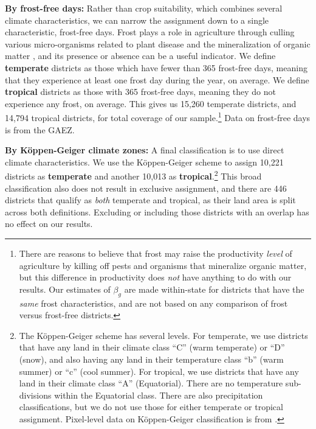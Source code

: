 \documentclass[11pt]{article}
\begin{document}
\vspace{.5cm}\noindent\textbf{By frost-free days:} Rather than crop suitability, which combines several climate characteristics, we can narrow the assignment down to a single characteristic, frost-free days. Frost plays a role in agriculture through culling various micro-organisms related to plant disease and the mineralization of organic matter \citep{Masters:2001kl}, and its presence or absence can be a useful indicator. We define \textbf{temperate} districts as those which have fewer than 365 frost-free days, meaning that they experience at least one frost day during the year, on average. We define \textbf{tropical} districts as those with 365 frost-free days, meaning they do not experience any frost, on average. This gives us 15,260 temperate districts, and 14,794 tropical districts, for total coverage of our sample.\footnote{There are reasons to believe that frost may raise the productivity \textit{level} of agriculture by killing off pests and organisms that mineralize organic matter, but this difference in productivity does \textit{not} have anything to do with our results. Our estimates of $\beta_g$ are made within-state for districts that have the \textit{same} frost characteristics, and are not based on any comparison of frost versus frost-free districts.} Data on frost-free days is from the GAEZ.

\vspace{.5cm}\noindent\textbf{By K{\"o}ppen-Geiger climate zones:} A final classification is to use direct climate characteristics. We use the K{\"o}ppen-Geiger scheme to assign 10,221 districts as \textbf{temperate} and another 10,013 as \textbf{tropical}.\footnote{The K{\"o}ppen-Geiger scheme has several levels. For temperate, we use districts that have any land in their climate class ``C'' (warm temperate) or ``D'' (snow), and also having any land in their temperature class ``b'' (warm summer) or ``c'' (cool summer). For tropical, we use districts that have any land in their climate class ``A'' (Equatorial). There are no temperature sub-divisions within the Equatorial class. There are also precipitation classifications, but we do not use those for either temperate or tropical assignment. Pixel-level data on K{\"o}ppen-Geiger classification is from \cite{kottek2006}.} This broad classification also does not result in exclusive assignment, and there are 446 districts that qualify as \textit{both} temperate and tropical, as their land area is split across both definitions. Excluding or including those districts with an overlap has no effect on our results.
\end{document}
